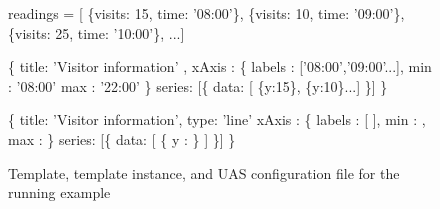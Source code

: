 \begin{figure*}
\begin{minipage}[c]{6cm}
\begin{minipage}[c]{6cm}
\begin{code}
readings = [
   \{visits: 15, time: '08:00'\}, 
   \{visits: 10, time: '09:00'\},
   \{visits: 25, time: '10:00'\},  ...]
\end{code}
\vspace*{-0.3cm}
\label{figure:running-example:query-result}
\vspace*{0.3cm}
\end{minipage}
%
\end{minipage}
\hspace{1cm}
\begin{minipage}[c]{6cm}
\begin{minipage}[c]{8.5cm}
\begin{code}
   \{
    title: 'Visitor information' ,
    xAxis : \{ 
      labels : ['08:00','09:00'...],
      min : '08:00'
      max : '22:00'
    \}
    series: [\{ data: [ \{y:15\}, \{y:10\}...] \}]
  \} 
\end{code}
\vspace*{-0.3cm}
\vspace*{0.3cm}
\label{figure:running-example:unit-body}
\end{minipage}
\begin{minipage}[c]{8.5cm}
\begin{code}
  \{
    title: 'Visitor information',
    type: 'line'
    xAxis : \{ 
      labels : [
        ],
      min : ,
      max : 
    \}
    series: [\{
      data: [ 
          \{
            y  : 
          \}
         ]
    \}]
  \}
\end{code}
\vspace*{-0.3cm}
\vspace*{0.3cm}
\label{figure:first-running-example:main-template}
\end{minipage}
\end{minipage}

\caption{Template, template instance, and UAS configuration file for the running example}

\end{figure*}


